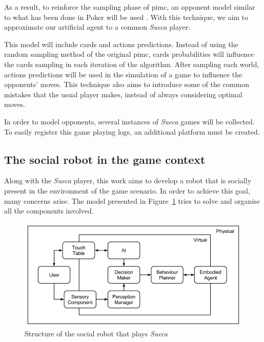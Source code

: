 
As a result, to reinforce the sampling phase of \gls{pimc}, an opponent model similar to what has been done in Poker will be used \cite{Ponsen2008}.
With this technique, we aim to approximate our artificial agent to a common \emph{Sueca} player.


This model will include cards and actions predictions.
Instead of using the random sampling method of the original \gls{pimc}, cards probabilities will influence the cards sampling in each iteration of the algorithm.
After sampling each world, actions predictions will be used in the simulation of a game to influence the opponents' moves.
This technique also aims to introduce some of the common mistakes that the usual player makes, instead of always considering optimal moves.


In order to model opponents, several instances of \emph{Sueca} games will be collected.
To easily register this game playing logs, an additional platform must be created.


\subsection{The social robot in the game context}
\label{sec:social_solution}

Along with the \emph{Sueca} player, this work aims to develop a robot that is socially present in the environment of the game scenario.
In order to achieve this goal, many concerns arise.
T\textit{}he model presented in Figure~\ref{fig:model} tries to solve and organise all the components involved.

\begin{figure}[ht]
  \centering
    \includegraphics[width=1\textwidth]{./img/model}
  \caption{Structure of the social robot that plays \emph{Sueca}}
\label{fig:model}
\end{figure}

